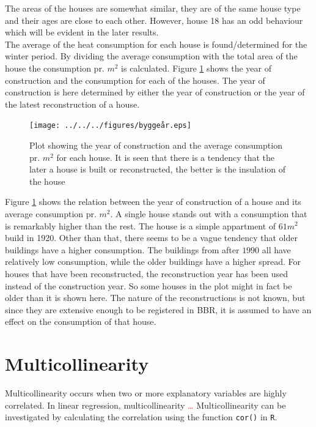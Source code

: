 \noindent The areas of the houses are somewhat similar, they are of the same house type and their ages are close to each other. However, house 18 has an odd behaviour which will be evident in the later results. \\

\noindent The average of the heat consumption for each house is found/determined for the winter period. By dividing the average consumption with the total area of the house the consumption pr. $m^2$ is calculated. Figure \ref{fig: byggeaar} shows the year of construction and the consumption for each of the houses. The year of construction is here determined by either the year of construction or the year of the latest reconstruction of a house. 
\begin{figure}
    \centering
    \texttt{[image: ../../../figures/byggeår.eps]}
    \caption{Plot showing the year of construction and the average consumption pr. $m^2$ for each house. It is seen that there is a tendency that the later a house is built or reconstructed, the better is the insulation of the house}
    \label{fig: byggeaar}
\end{figure}

\noindent Figure \ref{fig: byggeaar} shows the relation between the year of construction of a house and its average consumption pr. $m^2$. A single house stands out with a consumption that is remarkably higher than the rest. The house is a simple appartment of $61 m^2$ build in 1920. Other than that, there seems to be a vague tendency that older buildings have a higher consumption. The buildings from after $1990$ all have relatively low consumption, while the older buildings have a higher spread. For houses that have been reconstructed, the reconstruction year has been used instead of the construction year. So some houses in the plot might in fact be older than it is shown here. The nature of the reconstructions is not known, but since they are extensive enough to be registered in BBR, it is assumed to have an effect on the consumption of that house.


\section{Multicollinearity}
Multicollinearity occurs when two or more explanatory variables are highly correlated. In linear regression, multicollinearity \textcolor{red}{\dots} Multicollinearity can be investigated by calculating the correlation using the function \texttt{cor()} in \texttt{R}.\\

